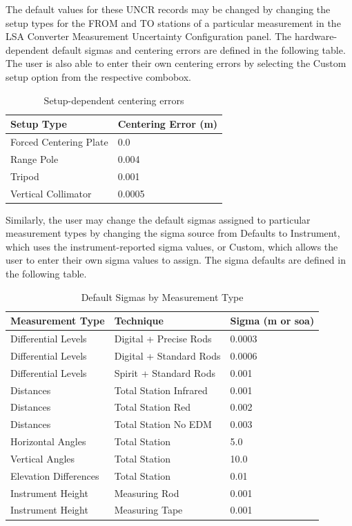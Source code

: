 The default values for these UNCR records may be changed by changing the setup types for the FROM and TO stations of a particular measurement in the LSA Converter Measurement Uncertainty Configuration panel.  The hardware-dependent default sigmas and centering errors are defined in the following table.  The user is also able to enter their own centering errors by selecting the Custom setup option from the respective combobox.

\begin{table}[!htbp]
	\caption{Setup-dependent centering errors}
	\label{tab:CenteringErrors}
	\begin{center}
		\begin{tabulary}{4.5 in}{LL}
			\hline
			\textbf{Setup Type} & \textbf{Centering Error (m)} \\
			\hline
			Forced Centering Plate & 0.0 \\
			Range Pole & 0.004 \\
			Tripod & 0.001 \\
			Vertical Collimator & 0.0005 \\
			\hline
		\end{tabulary}
	\end{center}
\end{table}


Similarly, the user may change the default sigmas assigned to particular measurement types by changing the sigma source from Defaults to Instrument, which uses the instrument-reported sigma values, or Custom, which allows the user to enter their own sigma values to assign.  The sigma defaults are defined in the following table.

\begin{table}[!htbp]
	\caption{Default Sigmas by Measurement Type}
	\label{tab:DefaultSigmas}
	\begin{center}
		\begin{tabulary}{4.5 in}{LLL}
			\hline
			\textbf{Measurement Type} & \textbf{Technique} & \textbf{Sigma (m or soa)} \\
			\hline
			Differential Levels & Digital + Precise Rods & 0.0003 \\
			Differential Levels & Digital + Standard Rods & 0.0006 \\
			Differential Levels & Spirit + Standard Rods & 0.001 \\
			Distances & Total Station Infrared & 0.001 \\
			Distances & Total Station Red & 0.002 \\
			Distances & Total Station No EDM & 0.003 \\
			Horizontal Angles & Total Station & 5.0 \\
			Vertical Angles & Total Station & 10.0 \\
			Elevation Differences & Total Station & 0.01 \\
			Instrument Height & Measuring Rod & 0.001 \\
			Instrument Height & Measuring Tape & 0.001 \\
			\hline
		\end{tabulary}
	\end{center}
\end{table}


